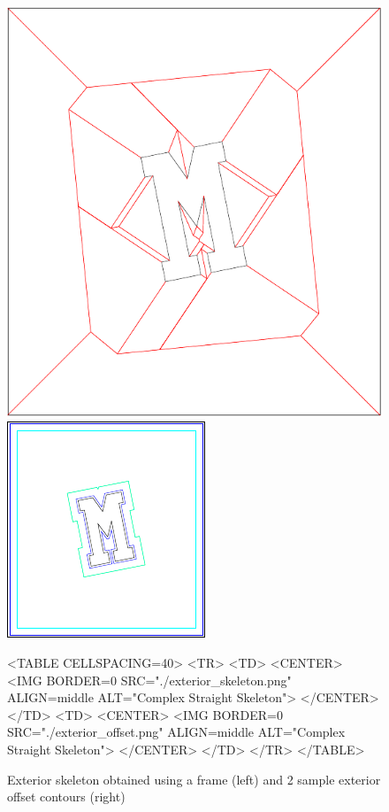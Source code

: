 \begin{figure}[htbp]
\begin{ccTexOnly}
\begin{center}
\includegraphics{Straight_skeleton_2/exterior_skeleton} %
\end{center}
\begin{center}
\includegraphics{Straight_skeleton_2/exterior_offset} %
\end{center}
\end{ccTexOnly}

\begin{ccHtmlOnly}
<TABLE CELLSPACING=40>
<TR>
<TD>
<CENTER>
<IMG BORDER=0 SRC="./exterior_skeleton.png" ALIGN=middle ALT="Complex Straight Skeleton">
</CENTER>
</TD>
<TD>
<CENTER>
<IMG BORDER=0 SRC="./exterior_offset.png" ALIGN=middle ALT="Complex Straight Skeleton">
</CENTER>
</TD>
</TR>
</TABLE>
\end{ccHtmlOnly}

\caption{Exterior skeleton obtained using a frame (left) and 2 sample exterior offset contours (right)
\label{Exterior}}
\end{figure}


